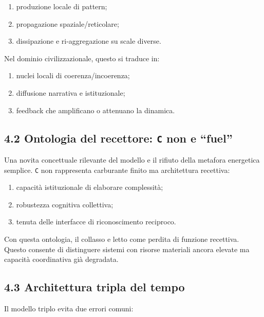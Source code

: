 \begin{enumerate}
\def\labelenumi{\arabic{enumi}.}
\tightlist
\item
  produzione locale di pattern;
\item
  propagazione spaziale/reticolare;
\item
  dissipazione e ri-aggregazione su scale diverse.
\end{enumerate}

Nel dominio civilizzazionale, questo si traduce in:

\begin{enumerate}
\def\labelenumi{\arabic{enumi}.}
\tightlist
\item
  nuclei locali di coerenza/incoerenza;
\item
  diffusione narrativa e istituzionale;
\item
  feedback che amplificano o attenuano la dinamica.
\end{enumerate}

\subsection{\texorpdfstring{4.2 Ontologia del recettore: \texttt{C} non e ``fuel''}{4.2 Ontologia del recettore: C non e ``fuel''}}

Una novita concettuale rilevante del modello e il rifiuto della metafora energetica semplice. \texttt{C} non rappresenta carburante finito ma architettura recettiva:

\begin{enumerate}
\def\labelenumi{\arabic{enumi}.}
\tightlist
\item
  capacità istituzionale di elaborare complessità;
\item
  robustezza cognitiva collettiva;
\item
  tenuta delle interfacce di riconoscimento reciproco.
\end{enumerate}

Con questa ontologia, il collasso e letto come perdita di funzione recettiva. Questo consente di distinguere sistemi con risorse materiali ancora elevate ma capacità coordinativa già degradata.

\subsection{4.3 Architettura tripla del tempo}

Il modello triplo evita due errori comuni:

